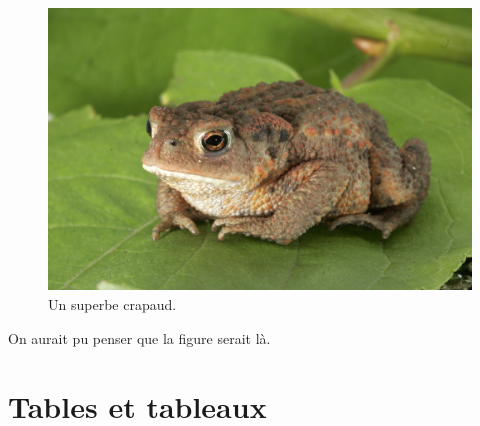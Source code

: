 \documentclass[10pt,a4paper,twoside]{article}
\begin{document}
\blindtext[2]

\begin{figure}[htbp]
    \begin{center}
        \includegraphics[width=1.\textwidth]{figures/toad.jpg}
    \end{center}
    \caption{Un superbe crapaud.}
    \label{fig:toad}
\end{figure}

On aurait pu penser que la figure serait là.
\blindtext[2]

\section{Tables et tableaux}
\end{document}
